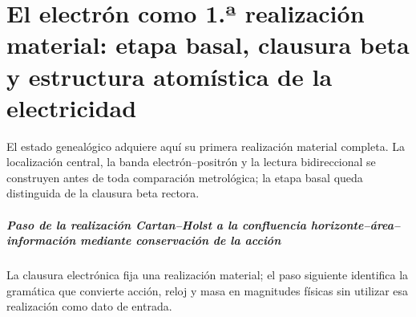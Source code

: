 \chapter{El electrón como 1.ª realización material: etapa basal, clausura beta y estructura atomística de la electricidad}
\label{chap:parte-iv-48}

El estado genealógico adquiere aquí su primera realización material completa. La localización central, la banda electrón--positrón y la lectura bidireccional se construyen antes de toda comparación metrológica; la etapa basal queda distinguida de la clausura beta rectora.





\paragraph{Paso de la realización Cartan–Holst a la confluencia horizonte–área–información mediante conservación de la acción} La clausura electrónica fija una realización material; el paso siguiente identifica la gramática que convierte acción, reloj y masa en magnitudes físicas sin utilizar esa realización como dato de entrada.
